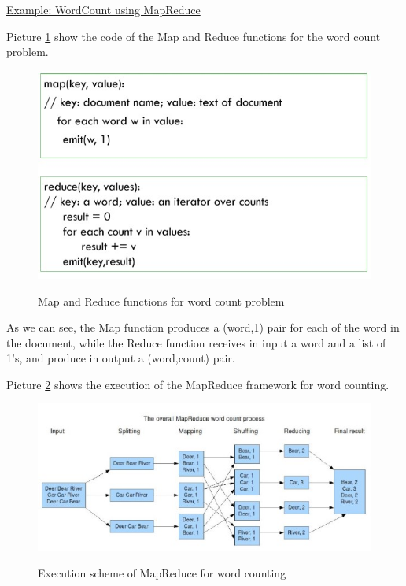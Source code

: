 \underline{Example: WordCount using MapReduce}

Picture \ref{wc code} show the code of the Map and Reduce functions for the word count problem.

\begin{figure}[h!]
		\centering
		\includegraphics[scale = 2.0]{img/word count code.jpg}
        \label{wc code}
        \caption{Map and Reduce functions for word count problem}
\end{figure}

As we can see, the Map function produces a (word,1) pair for each of the word in the document, while the Reduce function receives in input a word and a list of 1's, and produce in output a (word,count) pair.

Picture \ref{wc scheme} shows the execution of the MapReduce framework for word counting.

\begin{figure}[h!]
		\centering
		\includegraphics[scale = 2.0]{img/word count scheme.jpg}
        \label{wc scheme}
        \caption{Execution scheme of MapReduce for word counting}
\end{figure}

